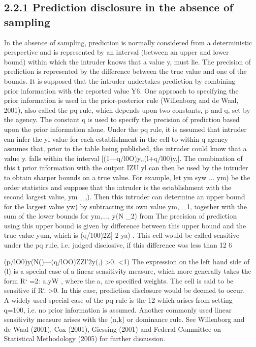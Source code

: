 \subsection*{2.2.1 Prediction disclosure in the absence of sampling}
In the absence of sampling, prediction is normally considered from a deterministic
perspective and is represented by an interval (between an upper and lower bound) within
which the intruder knows that a value y, must lie. The precision of prediction is
represented by the difference between the true value and one of the bounds. It is supposed
that the intruder undertakes prediction by combining prior information with the reported
value Y6.
One approach to specifying the prior information is used in the prior-posterior rule
(Willenborg and de Waal, 2001), also called the pq rule, which depends upon two
constants, p and q, set by the agency. The constant q is used to specify the precision of
prediction based upon the prior information alone. Under the pq rule, it is assumed that
intruder can infer the yl value for each establishment in the cell to within q%
agency assumes that, prior to the table being published, the intruder could know that a
value y. falls within the interval [(1—q/l0O)y,,(l+q/l00)y,]. The combination of this
t
prior information with the output IZU yl can then be used by the intruder to obtain
sharper bounds on a true value. For example, let ym syw $...$ ym) be the order
statistics and suppose that the intruder is the establishment with the second largest value,
ym _,). Then this intruder can determine an upper bound for the largest value yw) by
subtracting its own value ym, _1, together with the sum of the lower bounds for
ym,..., y(N _2) from  The precision of prediction using this upper bound is given by
difference between this upper bound and the true value yum, which is (q/100)2Z] 2 ya) .
This cell would be called sensitive under the pq rule, i.e. judged disclosive, if this
difference was less than 12%
6



(p/lO0)y(N()—(q/lOO)ZZl’2y(,) >0. <1)
The expression on the left hand side of (l) is a special case of a linear sensitivity
measure, which more generally takes the form R‘ =2: a,yW , where the a, are specified
weights. The cell is said to be sensitive if R‘. >0. In this case, prediction disclosure
would be deemed to occur. A widely used special case of the pq rule is the 12%
which arises from setting q=100, i.e. no prior information is assumed. Another
commonly used linear sensitivity measure arises with the (n,k) or dominance rule. See
Willenborg and de Waal (2001), Cox (2001), Giessing (2001) and Federal Committee on
Statistical Methodology (2005) for further discussion.
